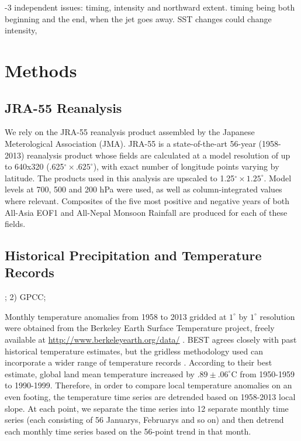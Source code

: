	-3 independent issues: timing, intensity and northward extent. timing being both beginning and the end, when the jet goes away. SST changes could change intensity, 
	
\section{Methods}

\subsection{JRA-55 Reanalysis}

	We rely on the JRA-55 reanalysis product assembled by the Japanese Meterological Association (JMA). JRA-55 is a state-of-the-art 56-year (1958-2013) reanalysis product whose fields are calculated at a model resolution of up to 640x320 (.625$^{\circ} \times .625^{\circ}$), with exact number of longitude points varying by latitude. The products used in this analysis are upscaled to 1.25$^{\circ} \times 1.25^{\circ}$. Model levels at 700, 500 and 200 hPa were used, as well as column-integrated values where relevant. Composites of the five most positive and negative years of both All-Asia EOF1 and All-Nepal Monsoon Rainfall are produced for each of these fields. 
	
	
\subsection{Historical Precipitation and Temperature Records}

	; 2) GPCC;

	Monthly temperature anomalies from 1958 to 2013 gridded at $1^{\circ}$ by $1^{\circ}$ resolution were obtained from the Berkeley Earth Surface Temperature project, freely available at \url{http://www.berkeleyearth.org/data/} \citep{Rohde2012}. BEST agrees closely with past historical temperature estimates, but the gridless methodology used can incorporate a wider range of temperature records \citep{Rohde2013}. According to their best estimate, global land mean temperature increased by $.89 \pm .06^{\circ}$C from 1950-1959 to 1990-1999. Therefore, in order to compare local temperature anomalies on an even footing, the temperature time series are detrended based on 1958-2013 local slope. At each point, we separate the time series into 12 separate monthly time series (each consisting of 56 Januarys, Februarys and so on) and then detrend each monthly time series based on the 56-point trend in that month.
	
